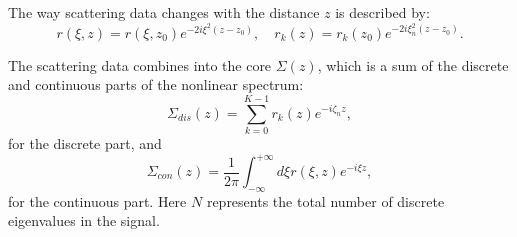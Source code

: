 

The way scattering data changes with the distance \( z \) is described by:
\begin{equation}
    r(\xi,z) = r(\xi,z_0) e^{-2i \xi^2 (z - z_0)}, \quad 
    r_k(z) = r_k(z_0) e^{-2i \xi_n^2 (z - z_0)}.
\end{equation}

The scattering data combines into the core \( \Sigma (z) \), which is a sum of the discrete and continuous parts of the nonlinear spectrum:
\begin{equation}
    \Sigma_{dis}(z) = \sum_{k = 0}^{K - 1} r_k(z) e^{-i \zeta_n z},
    \label{eq:kernel_sol}
\end{equation}
for the discrete part, and
\begin{equation}
    \Sigma_{con}(z) = \frac{1}{2\pi} \int_{-\infty}^{+\infty} d\xi r(\xi, z) e^{-i \xi z},
    \label{eq:kernel_rad}
\end{equation}
for the continuous part. Here \( N \) represents the total number of discrete eigenvalues in the signal.

